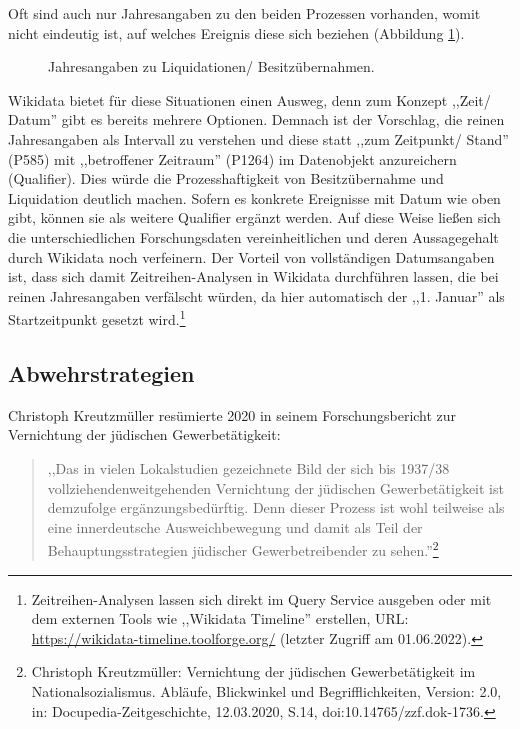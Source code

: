 Oft sind auch nur Jahresangaben zu den beiden Prozessen vorhanden, womit nicht eindeutig ist, auf welches Ereignis diese sich beziehen (Abbildung \ref{fig:datavernichtung}).   

\begin{figure}[h]
    \centering
    \caption{Jahresangaben zu Liquidationen/ Besitzübernahmen.}
    \label{fig:datavernichtung}
\end{figure}

Wikidata bietet für diese Situationen einen Ausweg, denn zum Konzept ,,Zeit/ Datum'' gibt es bereits mehrere Optionen. Demnach ist der Vorschlag, die reinen Jahresangaben als Intervall zu verstehen und diese statt ,,zum Zeitpunkt/ Stand'' (P585) mit ,,betroffener Zeitraum'' (P1264) im Datenobjekt anzureichern (Qualifier). Dies würde die Prozesshaftigkeit von Besitzübernahme und Liquidation deutlich machen. Sofern es konkrete Ereignisse mit Datum wie oben gibt, können sie als weitere Qualifier ergänzt werden. Auf diese Weise ließen sich die unterschiedlichen Forschungsdaten vereinheitlichen und deren Aussagegehalt durch Wikidata noch verfeinern. Der Vorteil von vollständigen Datumsangaben ist, dass sich damit Zeitreihen-Analysen in Wikidata durchführen lassen, die bei reinen Jahresangaben verfälscht würden, da hier automatisch der ,,1. Januar'' als Startzeitpunkt gesetzt wird.\footnote{Zeitreihen-Analysen lassen sich direkt im Query Service ausgeben oder mit dem externen Tools wie ,,Wikidata Timeline'' erstellen, URL: \url{https://wikidata-timeline.toolforge.org/} (letzter Zugriff am 01.06.2022).} 


\subsection{Abwehrstrategien}

Christoph Kreutzmüller resümierte 2020 in seinem Forschungsbericht zur Vernichtung der jüdischen Gewerbetätigkeit:

\begin{quote}
    ,,Das in vielen Lokalstudien gezeichnete Bild der sich bis 1937/38 vollziehendenweitgehenden Vernichtung der jüdischen Gewerbetätigkeit ist demzufolge ergänzungsbedürftig. Denn dieser Prozess ist wohl teilweise als eine innerdeutsche Ausweichbewegung und damit als Teil der Behauptungsstrategien jüdischer Gewerbetreibender zu sehen.''\footnote{Christoph Kreutzmüller: Vernichtung der jüdischen Gewerbetätigkeit im Nationalsozialismus. Abläufe, Blickwinkel und Begrifflichkeiten, Version: 2.0, in: Docupedia-Zeitgeschichte, 12.03.2020, S.14, doi:10.14765/zzf.dok-1736.}
\end{quote}


